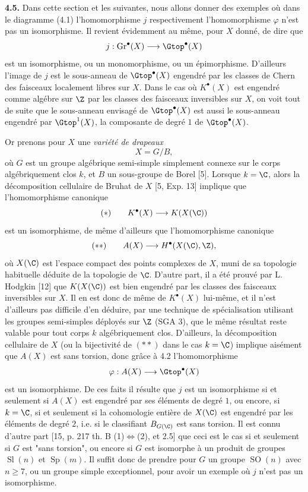 \textbf{4.5.} Dans cette section et les suivantes, nous allons donner des exemples où dans le diagramme (4.1) l'homomorphisme $j$ respectivement l'homomorphisme $\varphi$ n'est pas un isomorphisme. Il revient évidemment au même, pour $X$ donné, de dire que
\[
 j:\operatorname{Gr}^\bullet(X)\longrightarrow \Gtop^\bullet(X)
\]
est un isomorphisme, ou un monomorphisme, ou un épimorphisme. D'ailleurs l'image de $j$ est le sous-anneau de $\Gtop^\bullet(X)$ engendré par les classes de Chern des faisceaux localement libres sur $X$. Dans le cas où $K^\bullet(X)$ est engendré comme algébre sur $\Z$ par les classes des faisceaux inversibles sur $X$, on voit tout de suite que le sous-anneau envisagé de $\Gtop^\bullet(X)$ est aussi le sous-anneau engendré par $\Gtop^1(X)$, la composante de degré $1$ de $\Gtop^\bullet(X)$.

Or
prenons pour $X$ une \emph{variété de drapeaux}
\[
 X=G/B,
\]
où $G$ est un groupe algébrique semi-simple simplement connexe sur le corps algébriquement clos $k$, et $B$ un sous-groupe de Borel [5]. Lorsque $k=\C$, alors la décomposition cellulaire de Bruhat de $X$ [5, Exp. 13] implique que l'homomorphisme canonique
\[
 (*)\qquad K^\bullet(X)\longrightarrow K(X(\C))
\]
est un isomorphisme, de même d'ailleurs que l'homomorphisme canonique
\[
 (**)\qquad A(X)\longrightarrow H^\bullet(X(\C),\Z),
\]
où $X(\C)$ est l'espace compact des points complexes de $X$, muni de sa topologie habituelle déduite de la topologie de $\C$. D'autre part, il a été prouvé par L. Hodgkin [12] que $K(X(\C))$ est bien engendré par les classes des faisceaux inversibles sur $X$. Il en est donc de même de $K^\bullet(X)$ lui-même, et il n'est d'ailleurs pas difficile d'en déduire, par une technique de spécialisation utilisant les groupes semi-simples déployés sur $\Z$ (SGA 3), que le même résultat reste valable pour tout corps $k$ algébriquement clos. D'ailleurs, la décomposition cellulaire de $X$ (ou la bijectivité de $(**)$ dans le cas $k=\C$) implique aisément que $A(X)$ est sans torsion, donc grâce à 4.2 l'homomorphisme
\[
 \varphi:A(X)\longrightarrow\Gtop^\bullet(X)
\]
est un isomorphisme. De ces faits il résulte que $j$ est un isomorphisme si et seulement si $A(X)$ est engendré par ses éléments de degré $1$, ou encore, si $k=\C$, si et seulement si la cohomologie entière de $X(\C)$ est engendré par les éléments de degré $2$, i.e. si le classifiant $B_{G(\C)}$ est sans torsion. Il est connu d'autre part [15, p. 217 th. B (1)$\Leftrightarrow$(2), et 2.5] que ceci est le cas si et seulement si $G$ est "sans torsion", ou encore si $G$ est isomorphe à un produit de groupes $\operatorname{Sl}(n)$ et $\operatorname{Sp}(m)$. Il suffit donc de prendre pour $G$ un groupe $\operatorname{SO}(n)$ avec $n\geq 7$, ou un groupe simple exceptionnel, pour avoir un exemple où $j$ n'est pas un isomorphisme.

